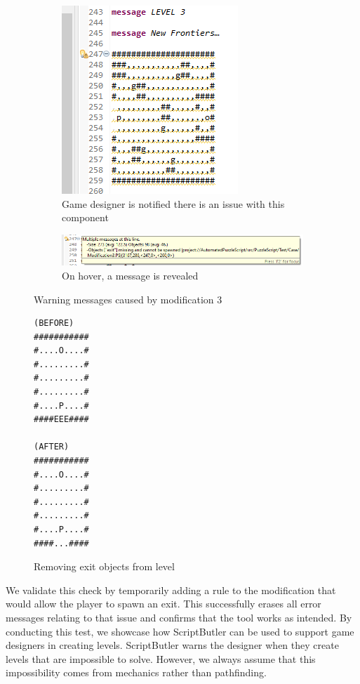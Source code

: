 \begin{figure}[!t]
    \begin{subfigure}{1\textwidth}
        \centering
        \includegraphics[scale=1.25]{images/case_results/Modification_3_Results_IDE.png}
        \caption{Game designer is notified there is an issue with this component}
    \end{subfigure}
    \begin{subfigure}{1\textwidth}
        \centering
        \includegraphics[scale=0.9]{images/case_results/Modification_3_Results.png}
        \caption{On hover, a message is revealed}
    \end{subfigure}
    \caption{Warning messages caused by modification 3}
    \label{fig:modification_3_results}
\end{figure}

\begin{figure}[!t]
\begin{lstlisting}[language=PuzzleScript]
(BEFORE)
###########
#....O....#
#.........#
#.........#
#.........#
#....P....#
####EEE####

(AFTER)
###########
#....O....#
#.........#
#.........#
#.........#
#....P....#
####...####
\end{lstlisting}
\vspace*{-8pt}
\caption{Removing exit objects from level}
\label{fig:case_m3_modification}
\vspace*{-8pt}
\end{figure}

We validate this check by temporarily adding a rule to the modification that would allow the player to spawn an exit. This successfully erases all error messages relating to that issue and confirms that the tool works as intended. By conducting this test, we showcase how ScriptButler can be used to support game designers in creating levels. ScriptButler warns the designer when they create levels that are impossible to solve. However, we always assume that this impossibility comes from mechanics rather than pathfinding. 

